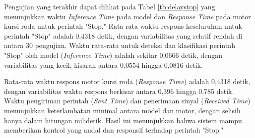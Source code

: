 Pengujian yang terakhir dapat dilihat pada Tabel \ref{tb:delaystop} yang menunjukkan waktu \emph{Inference Time} pada model dan \emph{Response Time} pada motor kursi roda untuk perintah "Stop." Rata-rata waktu respons keseluruhan untuk perintah "Stop" adalah 0,4318 detik, dengan variabilitas yang relatif rendah di antara 30 pengujian. Waktu rata-rata untuk deteksi dan klasifikasi perintah "Stop" oleh model (\emph{Inference Time}) adalah sekitar 0,0666 detik, dengan variabilitas yang kecil, kisaran antara 0,0554 hingga 0,0816 detik.

Rata-rata waktu respons motor kursi roda (\emph{Response Time}) adalah 0,4318 detik, dengan variabilitas waktu respons berkisar antara 0,396 hingga 0,785 detik. Waktu pengiriman perintah (\emph{Sent Time}) dan penerimaan sinyal (\emph{Received Time}) menunjukkan keterlambatan minimal antara model dan motor, dengan selisih hanya dalam hitungan milidetik. Hasil ini menunjukkan bahwa sistem mampu memberikan kontrol yang andal dan responsif terhadap perintah "Stop."

